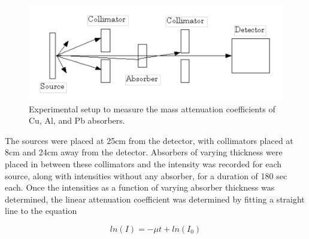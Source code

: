 \documentclass[%
 aip,
rsi,%
 amsmath,amssymb,
 reprint,%
author-numerical,%
]{revtex4-1}
\begin{document}
\begin{figure}[H]
\centering
\includegraphics[width=1\linewidth]{lateximages/MATexperiment.png} 
\caption{\label{fig:MATexperiment} Experimental setup to measure the mass attenuation coefficients of Cu, Al, and Pb absorbers.}
\end{figure}

The sources were placed at 25cm from the detector, with collimators placed at 8cm and 24cm away from the detector. Absorbers of varying thickness were placed in between these collimators and the intensity was recorded for each source, along with intensities without any absorber, for a duration of 180 sec each. \newline
\indent Once the intensities as a function of varying absorber thickness was determined, the linear attenuation coefficient was determined by fitting a straight line to the equation 

\begin{equation}
ln(I)= -\mu t + ln(I_{0})
 \label{eq:seventeen}
\end{equation}
\end{document}
